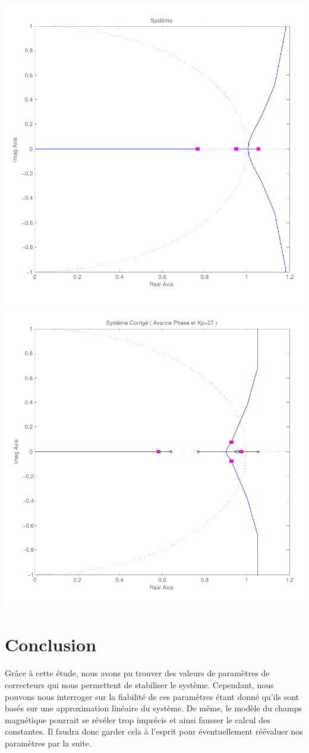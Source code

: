 \documentclass[11pt, french]{article} %
\begin{document}
\includegraphics[scale=0.50]{RLN_Sys_Seul.pdf}
\includegraphics[scale=0.50]{RLN_Sys_AvPh_K27.pdf}

\section{Conclusion}

Grâce à cette étude, nous avons pu trouver des valeurs de paramètres de correcteurs qui nous permettent de stabiliser le système. Cependant, nous pouvons nous interroger sur la fiabilité de ces paramètres étant donné qu'ils sont basés sur une approximation linéaire du système. De même, le modèle du champs magnétique pourrait se révéler trop imprécis et ainsi fausser le calcul des constantes. Il faudra donc garder cela à l'esprit pour éventuellement réévaluer nos paramètres par la suite. 
\end{document}
